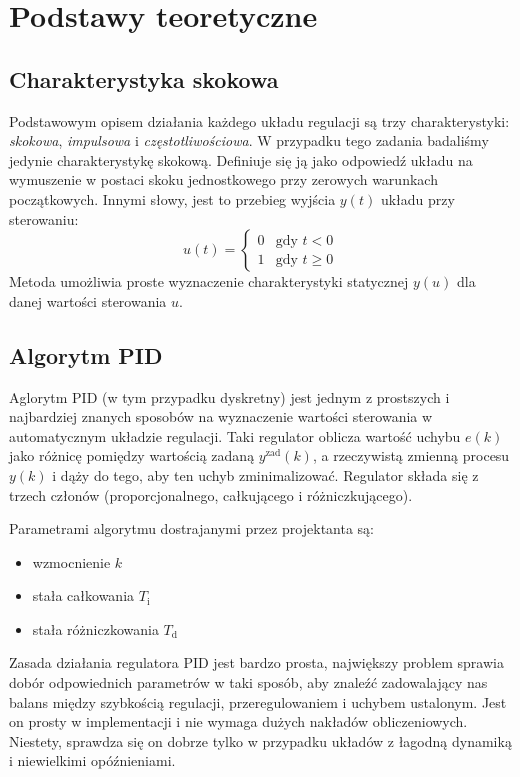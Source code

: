 \chapter{Podstawy teoretyczne}

\section{Charakterystyka skokowa}
Podstawowym opisem działania każdego układu regulacji są trzy charakterystyki: \textit{skokowa}, \textit{impulsowa} i \textit{częstotliwościowa}. W przypadku tego zadania badaliśmy jedynie charakterystykę skokową. Definiuje się ją jako odpowiedź układu na wymuszenie w postaci skoku jednostkowego przy zerowych warunkach początkowych. Innymi słowy, jest to przebieg wyjścia $y(t)$ układu przy sterowaniu:
\begin{equation}
u(t)=
\begin{cases}
0 & \textrm{gdy } t < 0\\
1 & \textrm{gdy } t \ge 0
\end{cases}
\nonumber
\end{equation}
Metoda umożliwia proste wyznaczenie charakterystyki statycznej $y(u)$  dla danej wartości sterowania $u$.

\section{Algorytm PID}
Aglorytm PID (w tym przypadku dyskretny) jest jednym z prostszych i najbardziej znanych sposobów na wyznaczenie wartości sterowania w automatycznym układzie regulacji. Taki regulator oblicza wartość uchybu $e(k)$ jako różnicę pomiędzy wartością zadaną $y^{\mathrm{zad}}(k)$, a rzeczywistą zmienną procesu $y(k)$ i dąży do tego, aby ten uchyb zminimalizować. Regulator składa się z trzech członów (proporcjonalnego, całkującego i różniczkującego). 

Parametrami algorytmu dostrajanymi przez projektanta są:

\begin{itemize}
	\item wzmocnienie $k$
	\item stała całkowania $T_{\mathrm{i}}$
	\item stała różniczkowania $T_{\mathrm{d}}$
\end{itemize} 

Zasada działania regulatora PID jest bardzo prosta, największy problem sprawia dobór odpowiednich parametrów w taki sposób, aby znaleźć zadowalający nas balans między szybkością regulacji, przeregulowaniem i uchybem ustalonym. Jest on prosty w implementacji i nie wymaga dużych nakładów obliczeniowych. Niestety, sprawdza się on dobrze tylko w przypadku układów z łagodną dynamiką i niewielkimi opóźnieniami.

